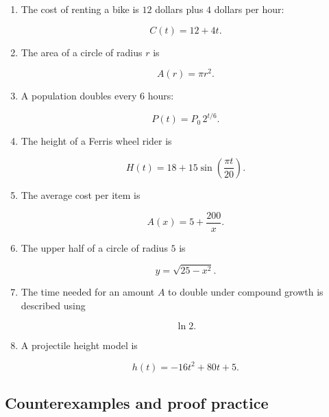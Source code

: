 \begin{enumerate}
\item The cost of renting a bike is \(12\) dollars plus \(4\) dollars per hour:

\[
C(t)=12+4t.
\]

\item The area of a circle of radius \(r\) is

\[
A(r)=\pi r^2.
\]

\item A population doubles every \(6\) hours:

\[
P(t)=P_0\,2^{t/6}.
\]

\item The height of a Ferris wheel rider is

\[
H(t)=18+15\sin\left(\frac{\pi t}{20}\right).
\]

\item The average cost per item is

\[
A(x)=5+\frac{200}{x}.
\]

\item The upper half of a circle of radius \(5\) is

\[
y=\sqrt{25-x^2}.
\]

\item The time needed for an amount \(A\) to double under compound growth is described using

\[
\ln 2.
\]

\item A projectile height model is

\[
h(t)=-16t^2+80t+5.
\]
\end{enumerate}

\subsection{Counterexamples and proof practice}
\label{subsec:counterexamples-proof-practice}

